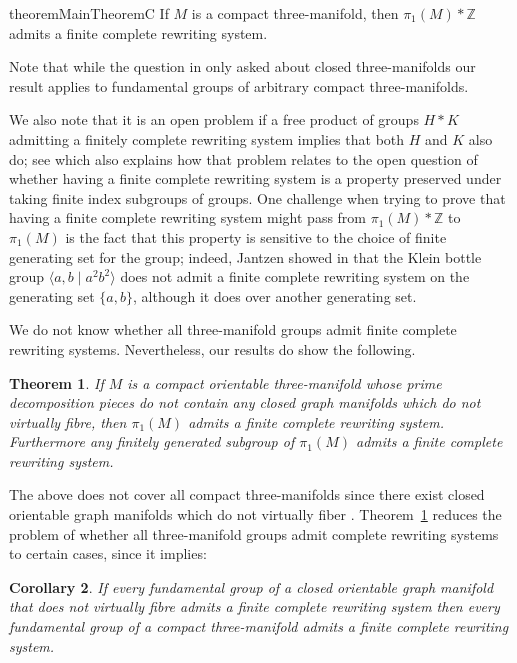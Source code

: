 \documentclass[12pt, a4paper]{amsart}
\newtheorem{theorem}{Theorem}[section]
\newtheorem{corollary}[theorem]{Corollary}
\theoremstyle{definition}
\newcommand{\Z}{\mathbb{Z}}
\newcounter{cases}
\begin{document}
\begin{restatable}{theorem}{MainTheoremC}
\label{thm:3-manifold:intro}
If $M$ is a compact three-manifold, then $\pi_1(M) \ast \Z$ admits a finite complete rewriting system.  
\end{restatable}

Note that while the question in \cite{Hermiller1999} only asked about closed three-manifolds our result applies to fundamental groups of arbitrary compact three-manifolds.   

We also note that it is an open problem if a free product of groups $H \ast K$ admitting a finitely complete rewriting system implies that both $H$ and $K$ also do; see \cite{Pride_Wang_2000} which also explains how that problem relates to the open question of whether having a finite complete rewriting system is a property preserved under taking finite index subgroups of groups. One challenge when trying to prove that having a finite complete rewriting system might pass from $\pi_1(M)*\Z$ to $\pi_1(M)$ is the fact that this property  is sensitive to the choice of finite generating set for the group; indeed, Jantzen showed in \cite{jantzen1985note} that the Klein bottle group $\langle a, b \mid a^2b^2\rangle$ does not admit a finite complete rewriting system on the generating set $\{a, b\}$, although it does over another generating set. 


We do not know whether all three-manifold groups admit finite complete rewriting systems. Nevertheless, our results do show the following.  
\begin{theorem}\label{thm:GoodPieces}
If $M$ is a compact orientable three-manifold whose prime decomposition pieces do not contain any closed graph manifolds which do not virtually fibre, then $\pi_1(M)$ admits a finite complete rewriting system. Furthermore any finitely generated subgroup of $\pi_1(M)$ admits a finite complete rewriting system. 
\end{theorem}
The above does not cover all compact three-manifolds since there exist closed orientable graph manifolds which do not virtually fiber \cite{LYQ97}. Theorem~\ref{thm:GoodPieces} reduces the problem of whether all three-manifold groups admit complete rewriting systems to certain cases, since it implies:

\begin{corollary}\label{thm:3ManReduction} 
If every fundamental group of a closed orientable graph manifold that does not virtually fibre admits a finite complete rewriting system then every fundamental group of a compact three-manifold admits a finite complete rewriting system.
  \end{corollary}
\end{document}
